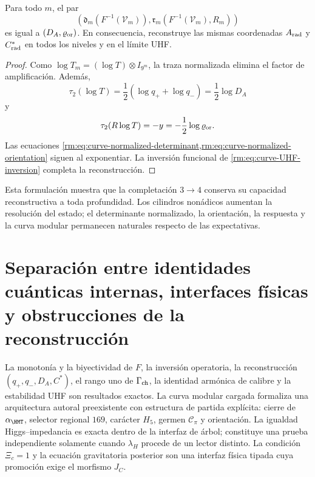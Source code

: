 \begin{proposition}
\label{rm:prop:curve-UHF-tomography}
Para todo \(m\), el par
\begin{equation}
 \left(
 \mathfrak d_m(F^{-1}(\mathcal V_m)),
 \mathfrak r_m(F^{-1}(\mathcal V_m),R_m)
 \right)
 \label{rm:eq:curve-UHF-pair}
\end{equation}
es igual a \((D_A,\varrho_{\rm or})\). En consecuencia, reconstruye las
mismas coordenadas \(A_{\rm rad}\) y \(C^*_{\rm rad}\) en todos los
niveles y en el l\'imite UHF.
\end{proposition}

\begin{proof}
Como
\(\log T_m=(\log T)\otimes I_{9^m}\), la traza normalizada elimina el
factor de amplificaci\'on. Adem\'as,
\[
 \tau_2(\log T)=\frac12(\log q_++\log q_-)=\frac12\log D_A
\]
y
\[
 \tau_2(R\log T)=-y=-\frac12\log\varrho_{\rm or}.
\]
Las ecuaciones \cref{rm:eq:curve-normalized-determinant,rm:eq:curve-normalized-orientation}
siguen al exponentiar. La inversi\'on funcional de
\cref{rm:eq:curve-UHF-inversion} completa la reconstrucci\'on.
\end{proof}

Esta formulaci\'on muestra que la completaci\'on \(3\to4\) conserva su
capacidad reconstructiva a toda profundidad. Los cilindros non\'adicos
aumentan la resoluci\'on del estado; el determinante normalizado, la
orientaci\'on, la respuesta y la curva modular permanecen naturales respecto
de las expectativas.

\section{Separación entre identidades cuánticas internas, interfaces físicas y obstrucciones de la reconstrucción}

\begin{proofstatusbox}
La monoton\'ia y la biyectividad de \(F\), la inversi\'on operatoria, la
reconstrucci\'on \((q_+,q_-,D_A,C^*)\), el rango uno de
\(\Gamma_{\rm ch}\), la identidad arm\'onica de calibre y la estabilidad UHF
son resultados exactos. La curva modular cargada formaliza una arquitectura
autoral preexistente con estructura de partida expl\'icita: cierre de
\(\alpha_{\HMT}\), selector regional \(169\), car\'acter \(H_5\), germen
\(\mathcal C_\pi\) y orientaci\'on. La igualdad
Higgs--impedancia es exacta dentro de la interfaz de \'arbol; constituye una
prueba independiente solamente cuando \(\lambda_H\) procede de un lector
distinto. La condici\'on \(\Xi_c=1\) y la ecuaci\'on gravitatoria posterior
son una interfaz f\'isica tipada cuya promoci\'on exige el morfismo \(J_C\).
\end{proofstatusbox}


